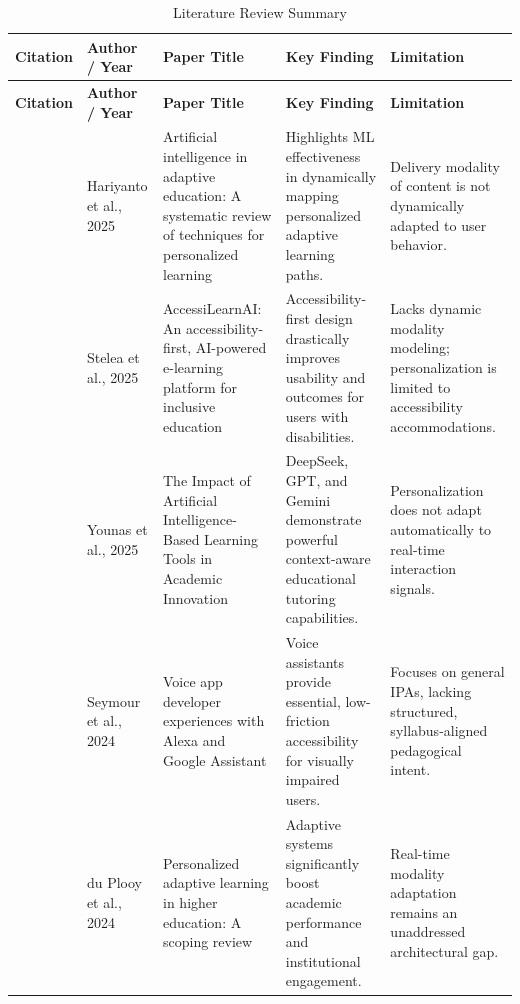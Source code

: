 \renewcommand{\arraystretch}{2}
\small

\begin{longtable}{|p{1.2cm}|p{2.8cm}|p{4.2cm}|p{4.0cm}|p{3.8cm}|}
	\caption{Literature Review Summary} \label{tab:litreview} \\
	\hline
	\textbf{Citation} & \textbf{Author / Year} & \textbf{Paper Title} & \textbf{Key Finding} & \textbf{Limitation} \\
	\hline
	\endfirsthead
	\hline
	\textbf{Citation} & \textbf{Author / Year} & \textbf{Paper Title} & \textbf{Key Finding} & \textbf{Limitation} \\
	\hline
	\endhead
	\hline
	\endfoot
	
	\cite{search17_hariyanto2025} & Hariyanto et al., 2025 & Artificial intelligence in adaptive education: A systematic review of techniques for personalized learning & Highlights ML effectiveness in dynamically mapping personalized adaptive learning paths. & Delivery modality of content is not dynamically adapted to user behavior. \\
	\hline
	
	\cite{search22_stelea2025} & Stelea et al., 2025 & AccessiLearnAI: An accessibility-first, AI-powered e-learning platform for inclusive education & Accessibility-first design drastically improves usability and outcomes for users with disabilities. & Lacks dynamic modality modeling; personalization is limited to accessibility accommodations. \\
	\hline
	
	\cite{younas2025ai} & Younas et al., 2025 & The Impact of Artificial Intelligence-Based Learning Tools in Academic Innovation & DeepSeek, GPT, and Gemini demonstrate powerful context-aware educational tutoring capabilities. & Personalization does not adapt automatically to real-time interaction signals. \\
	\hline
	
	\cite{seymour2023} & Seymour et al., 2024 & Voice app developer experiences with Alexa and Google Assistant & Voice assistants provide essential, low-friction accessibility for visually impaired users. & Focuses on general IPAs, lacking structured, syllabus-aligned pedagogical intent. \\
	\hline
	
	\cite{duplooy2024} & du Plooy et al., 2024 & Personalized adaptive learning in higher education: A scoping review & Adaptive systems significantly boost academic performance and institutional engagement. & Real-time modality adaptation remains an unaddressed architectural gap. \\
	\hline
	

\end{longtable}
